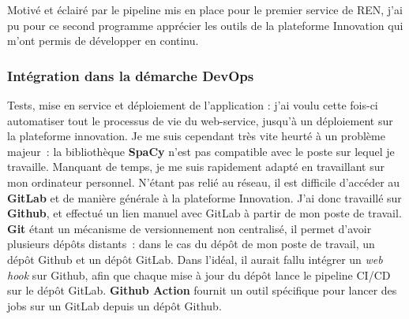 Motivé et éclairé par le pipeline mis en place pour le premier service de REN, j'ai pu pour ce second programme apprécier les outils de la plateforme Innovation qui m'ont permis de développer en continu.
\label{section 3.2.2 - React}

\subsubsection{Intégration dans la démarche DevOps}
Tests, mise en service et déploiement de l'application : j'ai voulu cette fois-ci automatiser tout le processus de vie du web-service, jusqu'à un déploiement sur la plateforme innovation. Je me suis cependant très vite heurté à un problème majeur~: la bibliothèque \textbf{SpaCy} n'est pas compatible avec le poste sur lequel je travaille. Manquant de temps, je me suis rapidement adapté en travaillant sur mon ordinateur personnel. N'étant pas relié au réseau, il est difficile d'accéder au \textbf{GitLab} et de manière générale à la plateforme Innovation. J'ai donc travaillé sur \textbf{Github}, et effectué un lien manuel avec GitLab à partir de mon poste de travail. \textbf{Git} étant un mécanisme de versionnement non centralisé, il permet d'avoir plusieurs dépôts distants~: dans le cas du dépôt de mon poste de travail, un dépôt Github et un dépôt GitLab. Dans l'idéal, il aurait fallu intégrer un \textit{web hook} sur Github, afin que chaque mise à jour du dépôt lance le pipeline CI/CD sur le dépôt GitLab. \textbf{Github Action} fournit un outil spécifique pour lancer des jobs sur un GitLab depuis un dépôt Github.
\newline

